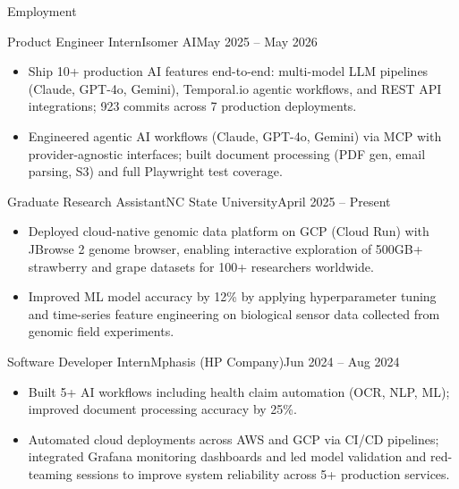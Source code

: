 \documentclass[]{mcdowellcv}
\begin{document}
\makeheader

\begin{cvsection}{Employment}
  \begin{cvsubsection}{Product Engineer Intern}{Isomer AI}{May 2025 -- May 2026}
    \begin{itemize}
      \item Ship 10+ production AI features end-to-end: multi-model LLM pipelines (Claude, GPT-4o, Gemini), Temporal.io agentic workflows, and REST API integrations; 923 commits across 7 production deployments.
      \item Engineered agentic AI workflows (Claude, GPT-4o, Gemini) via MCP with provider-agnostic interfaces; built document processing (PDF gen, email parsing, S3) and full Playwright test coverage.
    \end{itemize}
    \vspace{-1.5pt}
  \end{cvsubsection}

  \begin{cvsubsection}{Graduate Research Assistant}{NC State University}{April 2025 -- Present}
    \begin{itemize}
      \item Deployed cloud-native genomic data platform on GCP (Cloud Run) with JBrowse 2 genome browser, enabling interactive exploration of 500GB+ strawberry and grape datasets for 100+ researchers worldwide.
      \item Improved ML model accuracy by 12\% by applying hyperparameter tuning and time-series feature engineering on biological sensor data collected from genomic field experiments.
    \end{itemize}
    \vspace{-1.5pt}
  \end{cvsubsection}

  \begin{cvsubsection}{Software Developer Intern}{Mphasis (HP Company)}{Jun 2024 -- Aug 2024}
    \begin{itemize}
      \item Built 5+ AI workflows including health claim automation (OCR, NLP, ML); improved document processing accuracy by 25\%.
      \item Automated cloud deployments across AWS and GCP via CI/CD pipelines; integrated Grafana monitoring dashboards and led model validation and red-teaming sessions to improve system reliability across 5+ production services.
    \end{itemize}
    \vspace{-1.5pt}
  \end{cvsubsection}


\end{cvsection}
\end{document}

